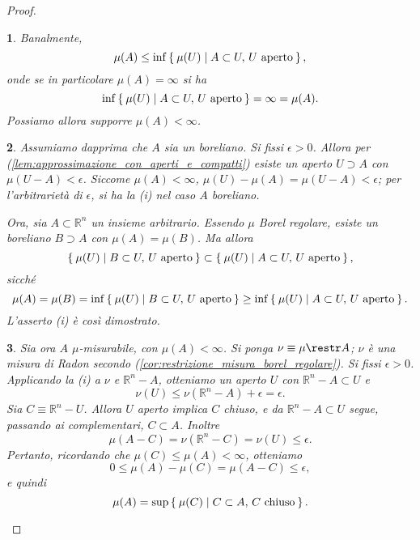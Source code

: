 \documentclass[a4paper,10pt,openright,oneside]{book}
\theoremstyle{theoremstyle}
\theoremstyle{theoremstylewoheader}
\theoremstyle{theoremstyle}
\theoremstyle{proofsecstyle}
\newtheorem{proofsec}{}
\theoremstyle{nonumberplain}
\newtheorem{proof}{Dim.}
\newcommand{\RR}{\ensuremath{\mathbb{R}}}
\begin{document}
\begin{proof}
\begin{proofsec}
Banalmente,
\[
\mu(A) \le \inf\Set{ \mu(U) | A \subset U,\, U \text{ aperto} },
\]
onde se in particolare $\mu(A) = \infty$ si ha
\[
\inf\Set{ \mu(U) | A \subset U,\, U \text{ aperto} } = \infty = \mu(A).
\]
Possiamo allora supporre $\mu(A) < \infty$.
\end{proofsec}

\begin{proofsec}
Assumiamo dapprima che $A$ sia un boreliano. Si fissi $\epsilon > 0$. Allora per (\ref{lem:approssimazione_con_aperti_e_compatti}) esiste un aperto $U \supset A$ con $\mu(U - A) < \epsilon$. Siccome $\mu(A) < \infty$, $\mu(U) - \mu(A) = \mu(U - A) < \epsilon$; per l'arbitrarietà di $\epsilon$, si ha la (i) nel caso $A$ boreliano.

Ora, sia $A \subset \RR^n$ un insieme arbitrario. Essendo $\mu$ Borel regolare, esiste un boreliano $B \supset A$ con $\mu(A) = \mu(B)$. Ma allora
\[
\Set{ \mu(U) | B \subset U,\, U \text{ aperto} } \subset \Set{ \mu(U) | A \subset U,\, U \text{ aperto} },
\]
sicché
\[
\mu(A) = \mu(B) = \inf\Set{ \mu(U) | B \subset U,\, U \text{ aperto} } \ge \inf\Set{ \mu(U) | A \subset U,\, U \text{ aperto} }.
\]
L'asserto (i) è così dimostrato.
\end{proofsec}

\begin{proofsec}
Sia ora $A$ $\mu$-misurabile, con $\mu(A) < \infty$. Si ponga $\nu \equiv \mu \restr A$; $\nu$ è una misura di Radon secondo (\ref{cor:restrizione_misura_borel_regolare}). Si fissi $\epsilon > 0$. Applicando la (i) a $\nu$ e $\RR^n - A$, otteniamo un aperto $U$ con $\RR^n - A \subset U$ e
\[
\nu(U) \le \nu(\RR^n - A) + \epsilon = \epsilon.
\]
Sia $C \equiv \RR^n - U$. Allora $U$ aperto implica $C$ chiuso, e da $\RR^n - A \subset U$ segue, passando ai complementari, $C \subset A$. Inoltre
\[
\mu(A - C) = \nu(\RR^n - C) = \nu(U) \le \epsilon.
\]
Pertanto, ricordando che $\mu(C) \le \mu(A) < \infty$, otteniamo
\[
0 \le \mu(A) - \mu(C) = \mu(A - C) \le \epsilon,
\]
e quindi
\[
\mu(A) = \sup\Set{ \mu(C) | C \subset A,\, C \text{ chiuso} }.
\]
\end{proofsec}


\end{proof}
\end{document}
